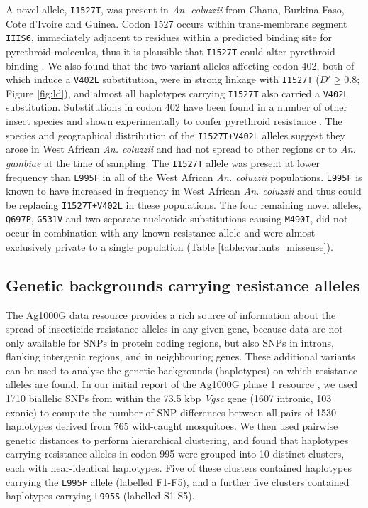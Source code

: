 \documentclass[a4paper,11pt,abstracton,hidelinks]{scrartcl}
\begin{document}
%
A novel allele, \texttt{I1527T}, was present in \textit{An. coluzzii} from Ghana, Burkina Faso, Cote d'Ivoire and Guinea.
%
Codon 1527 occurs within trans-membrane segment \texttt{IIIS6}, immediately adjacent to residues within a predicted binding site for pyrethroid molecules, thus it is plausible that \texttt{I1527T} could alter pyrethroid binding \cite{Du2013,Dong2014}.
%
We also found that the two variant alleles affecting codon 402, both of which induce a \texttt{V402L} substitution, were in strong linkage with \texttt{I1527T} ($D' \geq 0.8$; Figure \ref{fig:ld}), and almost all haplotypes carrying \texttt{I1527T} also carried a \texttt{V402L} substitution.
%
Substitutions in codon 402 have been found in a number of other insect species and shown experimentally to confer pyrethroid resistance \cite{Dong2014}.
%
The species and geographical distribution of the \texttt{I1527T+V402L} alleles suggest they arose in West African \textit{An. coluzzii} and had not spread to other regions or to \textit{An. gambiae} at the time of sampling.
%
The \texttt{I1527T} allele was present at lower frequency than \texttt{L995F} in all of the West African \textit{An. coluzzii} populations.
%
\texttt{L995F} is known to have increased in frequency in West African \textit{An. coluzzii} \cite{Toe2014} and thus could be replacing \texttt{I1527T+V402L} in these populations.
%
The four remaining novel alleles, \texttt{Q697P}, \texttt{G531V} and two separate nucleotide substitutions causing \texttt{M490I}, did not occur in combination with any known resistance allele and were almost exclusively private to a single population (Table \ref{table:variants_missense}).


\subsection*{Genetic backgrounds carrying resistance alleles}

%
The Ag1000G data resource provides a rich source of information about the spread of insecticide resistance alleles in any given gene, because data are not only available for SNPs in protein coding regions, but also SNPs in introns, flanking intergenic regions, and in neighbouring genes.
%
These additional variants can be used to analyse the genetic backgrounds (haplotypes) on which resistance alleles are found.
%
In our initial report of the Ag1000G phase 1 resource \cite{Ag1000gConsortium2017}, we used 1710 biallelic SNPs from within the 73.5 kbp \textit{Vgsc} gene (1607 intronic, 103 exonic) to compute the number of SNP differences between all pairs of 1530 haplotypes derived from 765 wild-caught mosquitoes.
%
We then used pairwise genetic distances to perform hierarchical clustering, and found that haplotypes carrying resistance alleles in codon 995 were grouped into 10 distinct clusters, each with near-identical haplotypes.
%
Five of these clusters contained haplotypes carrying the \texttt{L995F} allele (labelled F1-F5), and a further five clusters contained haplotypes carrying \texttt{L995S} (labelled S1-S5).
\end{document}
